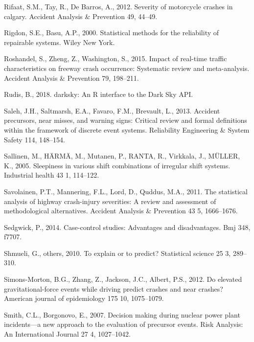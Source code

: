 \documentclass[12pt]{book}
\numberwithin{equation}{chapter}
\begin{document}
\leavevmode\hypertarget{ref-rifaat2012severity}{}%
Rifaat, S.M., Tay, R., De Barros, A., 2012. Severity of motorcycle crashes in calgary. Accident Analysis \& Prevention 49, 44--49.

\leavevmode\hypertarget{ref-rigdon2000statistical}{}%
Rigdon, S.E., Basu, A.P., 2000. Statistical methods for the reliability of repairable systems. Wiley New York.

\leavevmode\hypertarget{ref-roshandel2015impact}{}%
Roshandel, S., Zheng, Z., Washington, S., 2015. Impact of real-time traffic characteristics on freeway crash occurrence: Systematic review and meta-analysis. Accident Analysis \& Prevention 79, 198--211.

\leavevmode\hypertarget{ref-hrbrmstr}{}%
Rudis, B., 2018. darksky: An R interface to the Dark Sky API.

\leavevmode\hypertarget{ref-saleh2013accident}{}%
Saleh, J.H., Saltmarsh, E.A., Favaro, F.M., Brevault, L., 2013. Accident precursors, near misses, and warning signs: Critical review and formal definitions within the framework of discrete event systems. Reliability Engineering \& System Safety 114, 148--154.

\leavevmode\hypertarget{ref-sallinen2005sleepiness}{}%
Sallinen, M., HÄRMÄ, M., Mutanen, P., RANTA, R., Virkkala, J., MÜLLER, K., 2005. Sleepiness in various shift combinations of irregular shift systems. Industrial health 43 1, 114--122.

\leavevmode\hypertarget{ref-savolainen2011statistical}{}%
Savolainen, P.T., Mannering, F.L., Lord, D., Quddus, M.A., 2011. The statistical analysis of highway crash-injury severities: A review and assessment of methodological alternatives. Accident Analysis \& Prevention 43 5, 1666--1676.

\leavevmode\hypertarget{ref-sedgwick2014case}{}%
Sedgwick, P., 2014. Case-control studies: Advantages and disadvantages. Bmj 348, f7707.

\leavevmode\hypertarget{ref-shmueli2010explain}{}%
Shmueli, G., others, 2010. To explain or to predict? Statistical science 25 3, 289--310.

\leavevmode\hypertarget{ref-simons2012elevated}{}%
Simons-Morton, B.G., Zhang, Z., Jackson, J.C., Albert, P.S., 2012. Do elevated gravitational-force events while driving predict crashes and near crashes? American journal of epidemiology 175 10, 1075--1079.

\leavevmode\hypertarget{ref-smith2007decision}{}%
Smith, C.L., Borgonovo, E., 2007. Decision making during nuclear power plant incidents---a new approach to the evaluation of precursor events. Risk Analysis: An International Journal 27 4, 1027--1042.
\end{document}
